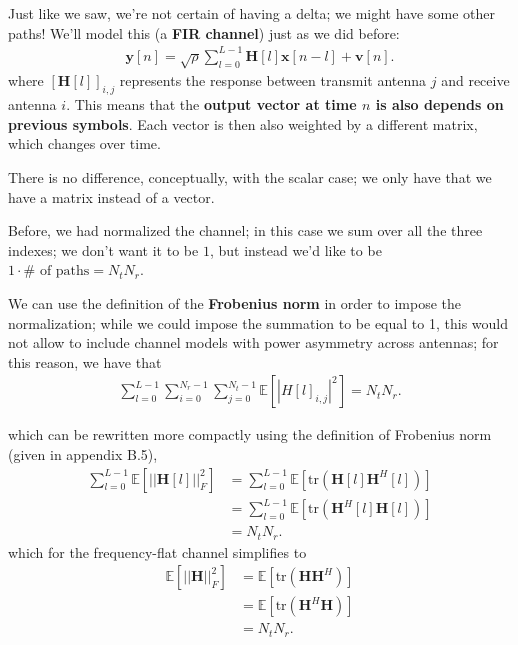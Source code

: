 \documentclass[a4paper, 12pt]{book}
\begin{document}
\noindent{}

Just like we saw, we're not certain of having a delta; we might have some other paths!
We'll model this (a \textbf{FIR channel}) just as we did before:
\begin{align}
\mathbf{y}[n] = \sqrt{\rho} \sum_{l=0}^{L-1} \mathbf{H}[l]\mathbf{x}[n-l] + \mathbf{v}[n]. \tag{2.80}
\end{align}
where $[\mathbf{H}[l]]_{i,j}$ represents the response between transmit antenna $j$ and receive antenna $i$.
This means that the \textbf{output vector at time $n$ is also depends on previous symbols}. Each vector is then also weighted by a different matrix, which changes over time.

There is no difference, conceptually, with the scalar case; we only have that we have a matrix instead of a vector.

Before, we had normalized the channel; in this case we sum over all the three indexes; we don't want it to be $1$, but instead we'd like to be $1 \cdot \# \text{ of paths} = \boxed{N_t N_r}$.

We can use the definition of the \textbf{Frobenius norm} in order to impose the normalization; while we could impose the summation to be equal to 1, this would not allow to include channel models with power asymmetry across antennas; for this reason, we have that
\begin{align}
\sum_{l=0}^{L-1} \sum_{i=0}^{N_r-1} \sum_{j=0}^{N_t-1} \mathbb{E}[|H[l]_{i,j}|^2] = N_t N_r. \tag{2.82}
\end{align}


which can be rewritten more compactly using the definition of Frobenius norm (given in appendix B.5),
\begin{align}
\sum_{l=0}^{L-1} \mathbb{E}[||\mathbf{H}[l]||_F^2] &= \sum_{l=0}^{L-1} \mathbb{E}[\text{tr}(\mathbf{H}[l]\mathbf{H}^H[l])] \tag{2.83} \\
&= \sum_{l=0}^{L-1} \mathbb{E}[\text{tr}(\mathbf{H}^H[l]\mathbf{H}[l])] \tag{2.84} \\
&= N_t N_r. \tag{2.85}
\end{align}
which for the frequency-flat channel simplifies to
\begin{align}
\mathbb{E}[||\mathbf{H}||_F^2] &= \mathbb{E}[\text{tr}(\mathbf{H}\mathbf{H}^H)] \tag{2.86} \\
&= \mathbb{E}[\text{tr}(\mathbf{H}^H\mathbf{H})] \nonumber \\
&= N_t N_r. \nonumber
\end{align}
\end{document}
